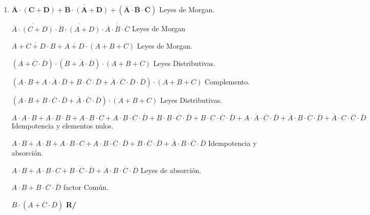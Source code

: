 \documentclass[12pt]{article}
\begin{document}
\begin{enumerate}[label = \textbf{\alph*.}]
\begin{enumerate}[label = \textbf{\arabic*.}]
                    \item $\mathbf{\overline{\overline{A} \cdot (C + D) + \overline{B} \cdot (A + D) + (\overline{A} \cdot \overline{B} \cdot \overline{C})}}$ Leyes de Morgan.
                        \par$\overline{\overline{A} \cdot (C + D)} \cdot \overline{\overline{B} \cdot (A + D)} \cdot \overline{ \overline{A} \cdot  \overline{B} \cdot  \overline{C}}$ Leyes de Morgan
                        \par$A + \overline{C + D} \cdot B + \overline{A + D} \cdot (A + B + C)$ Leyes de Morgan.
                        \par$(A + \overline{C} \cdot \overline{D}) \cdot (B + \overline{A} \cdot \overline{D}) \cdot (A + B + C)$ Leyes Distributivas.
                        \par$(A \cdot B + A \cdot \overline{A} \cdot \overline{D} + B \cdot \overline{C} \cdot \overline{D} + \overline{A} \cdot \overline{C} \cdot \overline{D} \cdot \overline{D}) \cdot (A + B + C)$ Complemento.
                        \par$(A \cdot B + B \cdot \overline{C} \cdot \overline{D} + \overline{A} \cdot \overline{C} \cdot \overline{D}) \cdot (A + B + C)$ Leyes Distributivas.
                        \par$A \cdot A \cdot B + A \cdot B \cdot B + A\cdot B \cdot C + A \cdot B \cdot \overline{C} \cdot \overline{D} + B \cdot B \cdot \overline{C} \cdot \overline{D} + B \cdot C \cdot \overline{C} \cdot \overline{D} + A \cdot \overline{A} \cdot \overline{C} \cdot \overline{D} + \overline{A} \cdot B \cdot \overline{C} \cdot \overline{D} + \overline{A} \cdot C \cdot \overline{C} \cdot \overline{D}$ Idempotencia y elementos nulos.
                        \par$A \cdot B + A \cdot B + A \cdot B \cdot C + A \cdot B \cdot \overline{C} \cdot \overline{D} + B \cdot \overline{C} \cdot \overline{D} + \overline{A} \cdot B \cdot \overline{C} \cdot \overline{D}$ Idempotencia y absorción.
                        \par$A \cdot B + A \cdot B \cdot C + B \cdot \overline{C} \cdot \overline{D} + \overline{A} \cdot B \cdot \overline{C} \cdot \overline{D}$ Leyes de absorción.
                        \par$A \cdot B + B \cdot \overline{C} \cdot \overline{D}$ factor Común.
                        \par$B \cdot (A + \overline{C} \cdot \overline{D})$ \textbf{R/}
                        \vspace{0.5cm}
                    

\end{enumerate}
\end{enumerate}
\end{document}

